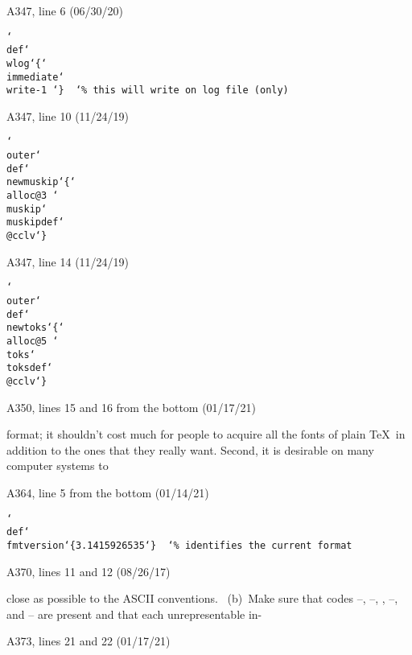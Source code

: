 \bugonpage A347, line 6 (06/30/20)

\ninepoint\noindent
\tt \char`\\def\char`\\wlog\char`\{\char`\\immediate\char`\\write-1 \char`\}
\ \char`\%\ this will write on log file (only)

\bugonpage A347, line 10 (11/24/19)

\ninepoint\noindent
\tt \char`\\outer\char`\\def\char`\\newmuskip\char`\{\char`\\alloc@3%
\char`\\muskip\char`\\muskipdef\char`\\@cclv\char`\}

\bugonpage A347, line 14 (11/24/19)

\ninepoint\noindent
\tt \char`\\outer\char`\\def\char`\\newtoks\char`\{\char`\\alloc@5%
\char`\\toks\char`\\toksdef\char`\\@cclv\char`\}

\bugonpage A350, lines 15 and 16 from the bottom (01/17/21)

\ninepoint\noindent
format; it shouldn't cost much for people to acquire all the
fonts of plain \TeX\ in addition to the ones that they really want. Second, it
is desirable on many computer systems to\cutpar

\bugonpage A364, line 5 from the bottom (01/14/21)

\ninepoint\noindent
\tt \char`\\def\char`\\fmtversion\char`\{3.1415926535\char`\} 
\ \char`\%\ identifies the current format

\bugonpage A370, lines 11 and 12 (08/26/17)

\ninepoint\noindent
close as possible to the ASCII conventions.
\ (b)~Make sure that codes --, --,
, --, and -- are present and that
each unrepresentable in-\cutpar

\bugonpage A373, lines 21 and 22 (01/17/21)

